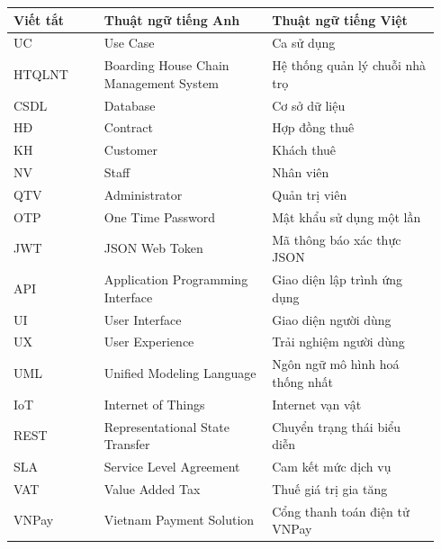 
\begin{longtable}[]{@{}>{\RaggedRight\arraybackslash}p{0.20\linewidth}>{\RaggedRight\arraybackslash}p{0.37\linewidth}>{\RaggedRight\arraybackslash}p{0.37\linewidth}@{}}
\toprule
\textbf{Viết tắt} & \textbf{Thuật ngữ tiếng Anh} & \textbf{Thuật ngữ
tiếng Việt}\tabularnewline
\midrule
\endhead
UC & Use Case & Ca sử dụng\tabularnewline
HTQLNT & Boarding House Chain Management System & Hệ thống quản lý chuỗi
nhà trọ\tabularnewline
CSDL & Database & Cơ sở dữ liệu\tabularnewline
HĐ & Contract & Hợp đồng thuê\tabularnewline
KH & Customer & Khách thuê\tabularnewline
NV & Staff & Nhân viên\tabularnewline
QTV & Administrator & Quản trị viên\tabularnewline
OTP & One Time Password & Mật khẩu sử dụng một lần\tabularnewline
JWT & JSON Web Token & Mã thông báo xác thực JSON\tabularnewline
API & Application Programming Interface & Giao diện lập trình ứng
dụng\tabularnewline
UI & User Interface & Giao diện người dùng\tabularnewline
UX & User Experience & Trải nghiệm người dùng\tabularnewline
UML & Unified Modeling Language & Ngôn ngữ mô hình hoá thống
nhất\tabularnewline
IoT & Internet of Things & Internet vạn vật\tabularnewline
REST & Representational State Transfer & Chuyển trạng thái biểu
diễn\tabularnewline
SLA & Service Level Agreement & Cam kết mức dịch vụ\tabularnewline
VAT & Value Added Tax & Thuế giá trị gia tăng\tabularnewline
VNPay & Vietnam Payment Solution & Cổng thanh toán điện tử
VNPay\tabularnewline
\bottomrule
\end{longtable}

